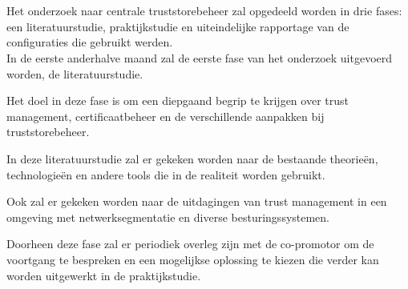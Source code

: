 
\chapter{}%
\label{ch:methodologie}


Het onderzoek naar centrale truststorebeheer zal opgedeeld worden in drie fases: een literatuurstudie, praktijkstudie en uiteindelijke rapportage van de configuraties die gebruikt werden. \\


In de eerste anderhalve maand zal de eerste fase van het onderzoek uitgevoerd worden, de literatuurstudie.

Het doel in deze fase is om een diepgaand begrip te krijgen over trust management, certificaatbeheer en de verschillende aanpakken bij truststorebeheer.

In deze literatuurstudie zal er gekeken worden naar de bestaande theorieën, technologieën en andere tools die in de realiteit worden gebruikt.

Ook zal er gekeken worden naar de uitdagingen van trust management in een omgeving met netwerksegmentatie en diverse besturingssystemen.

Doorheen deze fase zal er periodiek overleg zijn met de co-promotor om de voortgang te bespreken en een mogelijkse oplossing te kiezen die verder kan worden uitgewerkt in de praktijkstudie.\\


